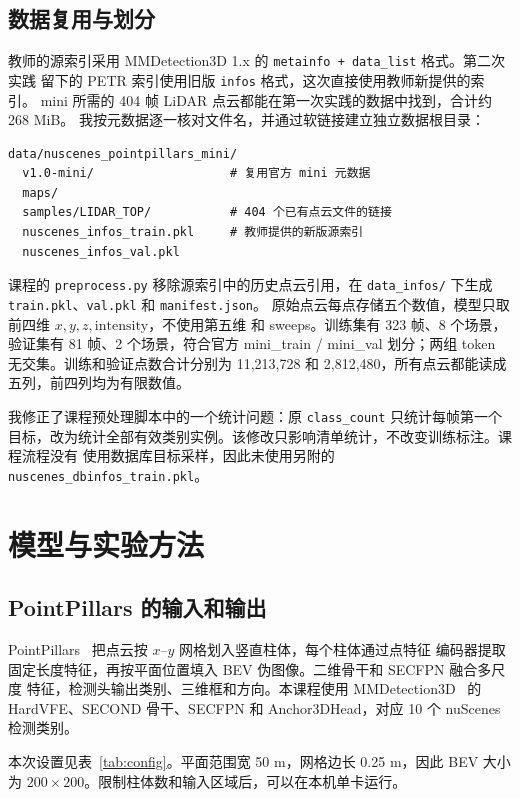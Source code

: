 \documentclass[UTF8,zihao=5,scheme=chinese]{ctexart}
\begin{document}
\subsection{数据复用与划分}

教师的源索引采用 MMDetection3D 1.x 的 \texttt{metainfo + data\_list} 格式。第二次实践
留下的 PETR 索引使用旧版 \texttt{infos} 格式，这次直接使用教师新提供的索引。
mini 所需的 404 帧 LiDAR 点云都能在第一次实践的数据中找到，合计约 268 MiB。
我按元数据逐一核对文件名，并通过软链接建立独立数据根目录：

\begin{verbatim}
data/nuscenes_pointpillars_mini/
  v1.0-mini/                   # 复用官方 mini 元数据
  maps/
  samples/LIDAR_TOP/           # 404 个已有点云文件的链接
  nuscenes_infos_train.pkl     # 教师提供的新版源索引
  nuscenes_infos_val.pkl
\end{verbatim}

课程的 \texttt{preprocess.py} 移除源索引中的历史点云引用，在 \texttt{data\_infos/}
下生成 \texttt{train.pkl}、\texttt{val.pkl} 和 \texttt{manifest.json}。
原始点云每点存储五个数值，模型只取前四维 $x,y,z,\mathrm{intensity}$，不使用第五维
和 sweeps。训练集有 323 帧、8 个场景，验证集有 81 帧、2 个场景，符合官方
mini\_train / mini\_val 划分；两组 token 无交集。训练和验证点数合计分别为
11,213,728 和 2,812,480，所有点云都能读成五列，前四列均为有限数值。

我修正了课程预处理脚本中的一个统计问题：原 \texttt{class\_count} 只统计每帧第一个
目标，改为统计全部有效类别实例。该修改只影响清单统计，不改变训练标注。课程流程没有
使用数据库目标采样，因此未使用另附的 \texttt{nuscenes\_dbinfos\_train.pkl}。

\section{模型与实验方法}

\subsection{PointPillars 的输入和输出}

PointPillars~\cite{pointpillars} 把点云按 $x$--$y$ 网格划入竖直柱体，每个柱体通过点特征
编码器提取固定长度特征，再按平面位置填入 BEV 伪图像。二维骨干和 SECFPN 融合多尺度
特征，检测头输出类别、三维框和方向。本课程使用 MMDetection3D~\cite{mmdet3d} 的 HardVFE、SECOND
骨干、SECFPN 和 Anchor3DHead，对应 10 个 nuScenes 检测类别。

本次设置见表~\ref{tab:config}。平面范围宽 50 m，网格边长 0.25 m，因此 BEV 大小为
$200\times200$。限制柱体数和输入区域后，可以在本机单卡运行。
\end{document}

